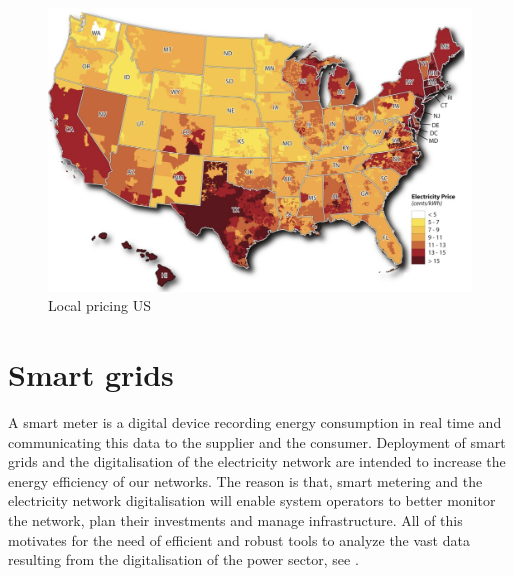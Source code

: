 \begin{figure}[!h]
    \includegraphics[width=\textwidth]{images/us_local.png}
    \caption[Local pricing US]{Local pricing US }
    \label{fig:us_local}
\end{figure}

\section{Smart grids}
A smart meter is a digital device recording energy consumption in real time and communicating this data to the supplier and the consumer.
Deployment of smart grids and the digitalisation of the electricity network are intended to increase the energy efficiency of our networks.
The reason is that, smart metering and the electricity network digitalisation  will enable system operators to better monitor the network, plan their investments and manage infrastructure. 
All of this motivates for the need of efficient and robust tools to analyze the vast data resulting from the digitalisation of the power sector, see \cite{declean,andreadou2016telecommunication}.


